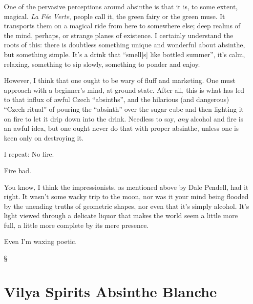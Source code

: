 \documentclass[12pt,letterpaper,oneside]{memoir}
\newcommand\secdiv{
  \begin{center}
    \S
  \end{center}
}
\begin{document}
  One of the pervasive perceptions around absinthe is that it is, to some extent, magical.  \textit{La F\'ee Verte}, people call it, the green fairy or the green muse.  It transports them on a magical ride from here to somewhere else; deep realms of the mind, perhaps, or strange planes of existence.  I certainly understand the roots of this: there is doubtless something unique and wonderful about absinthe, but something simple.  It's a drink that ``smell[s] like bottled summer'', it's calm, relaxing, something to sip slowly, something to ponder and enjoy.

  However, I think that one ought to be wary of fluff and marketing.  One must approach with a beginner's mind, at ground state. After all, this is what has led to that influx of awful Czech ``absinths'', and the hilarious (and dangerous) ``Czech ritual'' of pouring the ``absinth'' over the sugar cube and then lighting it on fire to let it drip down into the drink.  Needless to say, \textit{any} alcohol and fire is an awful idea, but one ought never do that with proper absinthe, unless one is keen only on destroying it.

  I repeat: No fire.

  Fire bad.

  You know, I think the impressionists, as mentioned above by Dale Pendell, had it right.  It wasn't some wacky trip to the moon, nor was it your mind being flooded by the unending truths of geometric shapes, nor even that it's simply alcohol.  It's light viewed through a delicate liquor that makes the world seem a little more full, a little more complete by its mere presence.

  Even I'm waxing poetic.

  \secdiv

  \section*{Vilya Spirits Absinthe Blanche}
\end{document}
